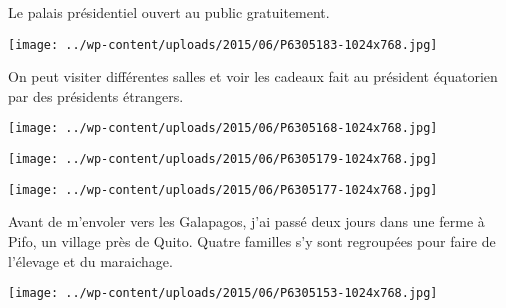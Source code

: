 \pagebreak

Le palais présidentiel ouvert au public gratuitement. 
\begin{center} 
\texttt{[image: ../wp-content/uploads/2015/06/P6305183-1024x768.jpg]} 
\end{center}

On peut visiter différentes salles et voir les cadeaux fait au président équatorien par des présidents étrangers. 
\begin{center} 
\texttt{[image: ../wp-content/uploads/2015/06/P6305168-1024x768.jpg]} 
\end{center}
\begin{center} 
\texttt{[image: ../wp-content/uploads/2015/06/P6305179-1024x768.jpg]} 
\end{center}
\begin{center} 
\texttt{[image: ../wp-content/uploads/2015/06/P6305177-1024x768.jpg]} 
\end{center}
\pagebreak

Avant de m'envoler vers les Galapagos, j'ai passé deux jours dans une ferme à Pifo, un village près de Quito.  Quatre familles s'y sont regroupées pour faire de l'élevage et du maraichage.
\begin{center} 
\texttt{[image: ../wp-content/uploads/2015/06/P6305153-1024x768.jpg]} 
\end{center}
